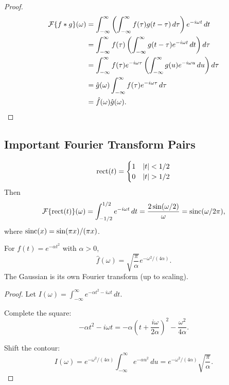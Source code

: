 \begin{notechapter}
\begin{proof}
\begin{align*}
\mathcal{F}\{f * g\}(\omega) &= \int_{-\infty}^{\infty} \left( \int_{-\infty}^{\infty} f(\tau) g(t - \tau) \, d\tau \right) e^{-i\omega t} \, dt \\
&= \int_{-\infty}^{\infty} f(\tau) \left( \int_{-\infty}^{\infty} g(t - \tau) e^{-i\omega t} \, dt \right) d\tau \\
&= \int_{-\infty}^{\infty} f(\tau) e^{-i\omega \tau} \left( \int_{-\infty}^{\infty} g(u) e^{-i\omega u} \, du \right) d\tau \\
&= \hat{g}(\omega) \int_{-\infty}^{\infty} f(\tau) e^{-i\omega \tau} \, d\tau \\
&= \hat{f}(\omega) \hat{g}(\omega).
\end{align*}
\end{proof}

\subsection{Important Fourier Transform Pairs}

\begin{example}
\[
\operatorname{rect}(t) = \begin{cases}
1 & \left|t\right| < 1/2 \\
0 & \left|t\right| > 1/2
\end{cases}
\]
Then
\[
\mathcal{F}\{\operatorname{rect}(t)\}(\omega) = \int_{-1/2}^{1/2} e^{-i\omega t} \, dt = \frac{2\sin(\omega/2)}{\omega} = \operatorname{sinc}(\omega/2\pi),
\]
where $\operatorname{sinc}(x) = \sin(\pi x)/(\pi x)$.
\end{example}

\begin{example}[Gaussian]
For $f(t) = e^{-\alpha t^2}$ with $\alpha > 0$,
\[
\hat{f}(\omega) = \sqrt{\frac{\pi}{\alpha}} e^{-\omega^2/(4\alpha)}.
\]
The Gaussian is its own Fourier transform (up to scaling).
\end{example}

\begin{proof}
Let $I(\omega) = \int_{-\infty}^{\infty} e^{-\alpha t^2 - i\omega t} \, dt$.

Complete the square:
\[
-\alpha t^2 - i\omega t = -\alpha \left( t + \frac{i\omega}{2\alpha} \right)^2 - \frac{\omega^2}{4\alpha}.
\]

Shift the contour:
\[
I(\omega) = e^{-\omega^2/(4\alpha)} \int_{-\infty}^{\infty} e^{-\alpha u^2} \, du = e^{-\omega^2/(4\alpha)} \sqrt{\frac{\pi}{\alpha}}.
\]
\end{proof}


\end{notechapter}
